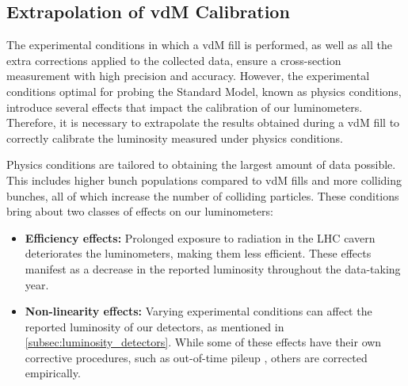 


\subsection{Extrapolation of vdM Calibration}

The experimental conditions in which a vdM fill is performed, as well as all the extra corrections applied to the collected data, ensure a cross-section measurement with high precision and accuracy. However, the experimental conditions optimal for probing the Standard Model, known as physics conditions, introduce several effects that impact the calibration of our luminometers. Therefore, it is necessary to extrapolate the results obtained during a vdM fill to correctly calibrate the luminosity measured under physics conditions.

Physics conditions are tailored to obtaining the largest amount of data possible. This includes higher bunch populations compared to vdM fills and more colliding bunches, all of which increase the number of colliding particles. These conditions bring about two classes of effects on our luminometers:

\begin{itemize}
    \item \textbf{Efficiency effects:} Prolonged exposure to radiation in the LHC cavern deteriorates the luminometers, making them less efficient. These effects manifest as a decrease in the reported luminosity throughout the data-taking year.
    \item \textbf{Non-linearity effects:} Varying experimental conditions can affect the reported luminosity of our detectors, as mentioned in \autoref{subsec:luminosity_detectors}. While some of these effects have their own corrective procedures, such as out-of-time pileup \cite{Sirunyan:2759951}, others are corrected empirically.
\end{itemize}

